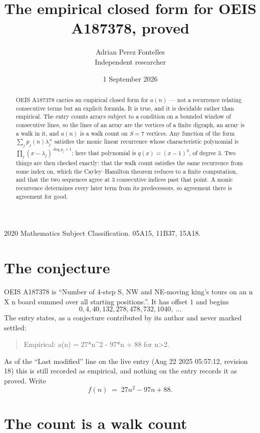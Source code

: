 \documentclass[11pt,a4paper]{article}
\title{The empirical closed form for OEIS A187378, proved}
\author{Adrian Perez Fontelles\\ \small Independent researcher}
\date{1 September 2026}
\theoremstyle{plain}
\theoremstyle{definition}
\begin{document}
\maketitle

\begin{abstract}
OEIS A187378 carries an empirical closed form for $a(n)$ --- not a recurrence relating
consecutive terms but an explicit formula. It is true, and it is decidable rather than
empirical. The entry counts arrays subject to a condition on a bounded window of consecutive lines, so the lines of an array are the
vertices of a finite digraph, an array is a walk in it, and $a(n)$ is a walk count on
$S=7$ vertices. Any function of the form $\sum_j p_j(n)\lambda_j^{\,n}$ satisfies the
monic linear recurrence whose characteristic polynomial is
$\prod_j(x-\lambda_j)^{\deg p_j+1}$; here that polynomial is $q(x)=(x-1)^{3}$, of degree
$3$. Two things are then checked exactly: that the walk count satisfies the same
recurrence from some index on, which the Cayley--Hamilton theorem reduces to a finite
computation, and that the two sequences agree at $3$ consecutive indices past that
point. A monic recurrence determines every later term from its predecessors, so agreement
there is agreement for good.
\end{abstract}

\noindent\small 2020 Mathematics Subject Classification. 05A15, 11B37, 15A18.\normalsize

\section{The conjecture}

OEIS A187378 is ``Number of 4-step S, NW and NE-moving king's tours on an n X n board summed over all starting positions.''. It has offset $1$ and begins
\[
0, 4, 40, 132, 278, 478, 732, 1040,\ \dots
\]
The entry states, as a conjecture contributed by its author and never marked settled:
\begin{quote}
Empirical: a(n) = 27*n\^{}2 - 97*n + 88 for n>2.
\end{quote}
As of the ``Last modified'' line on the live entry (Aug 22 2025 05:57:12, revision 18) this is still
recorded as empirical, and nothing on the entry records it as proved. Write
\[
f(n)\;=\;27 n^{2} - 97 n + 88.
\]

\section{The count is a walk count}
\end{document}

